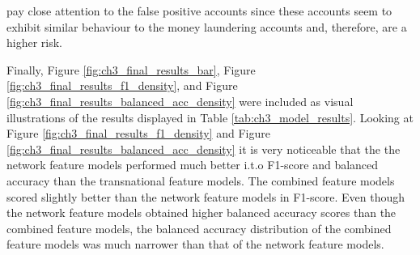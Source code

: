 pay close attention to the false positive accounts since these accounts seem to exhibit similar behaviour to the money laundering accounts and, therefore, are a higher risk.  

Finally, Figure \ref{fig:ch3_final_results_bar}, Figure \ref{fig:ch3_final_results_f1_density}, and Figure \ref{fig:ch3_final_results_balanced_acc_density} were included as visual illustrations of the results displayed in Table \ref{tab:ch3_model_results}. Looking at Figure \ref{fig:ch3_final_results_f1_density} and Figure \ref{fig:ch3_final_results_balanced_acc_density} it is very noticeable that the the network feature models performed much better i.t.o F1-score and balanced accuracy than the transnational feature models. The combined feature models scored slightly better than the network feature models in F1-score. Even though the network feature models obtained higher balanced accuracy scores than the combined feature models, the balanced accuracy distribution of the combined feature models was much narrower than that of the network feature models.  

